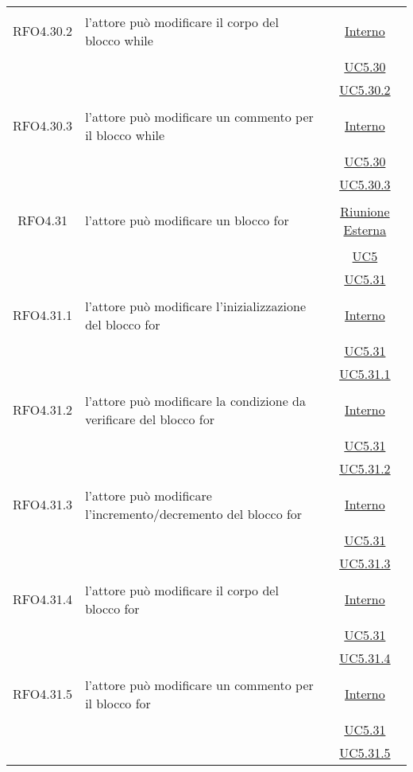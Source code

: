 \begin{longtable}{|c|>{\centering}m{7cm}|c|}
\hypertarget{RFO4.30.2}{RFO4.30.2} & l'attore può modificare il corpo del blocco while & \hyperlink{Interno}{Interno}\\
& &\hyperref[UC5.30]{UC5.30}\\
& &\hyperref[UC5.30.2]{UC5.30.2}\\ \hline

\hypertarget{RFO4.30.3}{RFO4.30.3} & l'attore può modificare un commento per il blocco while & \hyperlink{Interno}{Interno}\\
& &\hyperref[UC5.30]{UC5.30}\\
& &\hyperref[UC5.30.3]{UC5.30.3}\\ \hline

\hypertarget{RFO4.31}{RFO4.31} & l'attore può modificare un blocco for &  \hyperlink{Riunione Esterna}{Riunione Esterna}\\
& &\hyperref[UC5]{UC5}\\
& &\hyperref[UC5.31]{UC5.31}\\ \hline

\hypertarget{RFO4.31.1}{RFO4.31.1} & l'attore può modificare l'inizializzazione del blocco for & \hyperlink{Interno}{Interno}\\
& &\hyperref[UC5.31]{UC5.31}\\
& &\hyperref[UC5.31.1]{UC5.31.1}\\ \hline

\hypertarget{RFO4.31.2}{RFO4.31.2} & l'attore può modificare la condizione da verificare del blocco for & \hyperlink{Interno}{Interno}\\
& &\hyperref[UC5.31]{UC5.31}\\
& &\hyperref[UC5.31.2]{UC5.31.2}\\ \hline

\hypertarget{RFO4.31.3}{RFO4.31.3} & l'attore può modificare l'incremento/decremento del blocco for & \hyperlink{Interno}{Interno}\\
& &\hyperref[UC5.31]{UC5.31}\\
& &\hyperref[UC5.31.3]{UC5.31.3}\\ \hline

\hypertarget{RFO4.31.4}{RFO4.31.4} & l'attore può modificare il corpo del blocco for &\hyperlink{Interno}{Interno}\\
& &\hyperref[UC5.31]{UC5.31}\\
& &\hyperref[UC5.31.4]{UC5.31.4}\\ \hline

\hypertarget{RFO4.31.5}{RFO4.31.5} & l'attore può modificare un commento per il blocco for & \hyperlink{Interno}{Interno}\\
& &\hyperref[UC5.31]{UC5.31}\\
& &\hyperref[UC5.31.5]{UC5.31.5}\\ \hline


\end{longtable}
